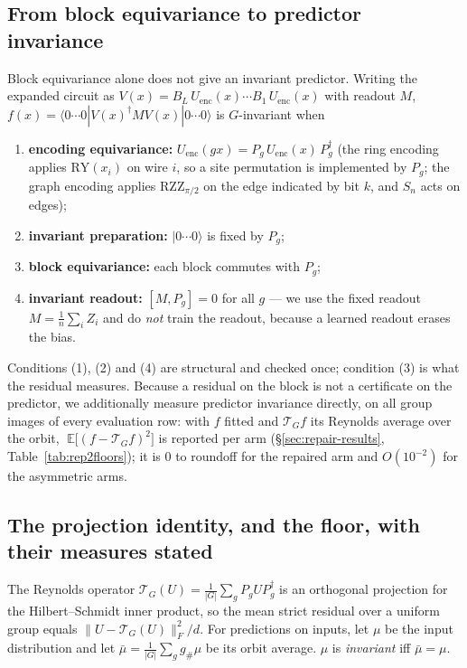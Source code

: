 \documentclass[11pt]{article}
\newcommand{\Tg}{\mathcal{T}_G}
\begin{document}
\subsection{From block equivariance to predictor invariance}
\label{sec:conditions}

Block equivariance alone does not give an invariant predictor. Writing the expanded
circuit as $V(x)=B_L\,U_{\mathrm{enc}}(x)\cdots B_1\,U_{\mathrm{enc}}(x)$ with readout
$M$, $f(x)=\langle 0\cdots0|V(x)^{\dagger} M V(x)|0\cdots0\rangle$ is $G$-invariant when
\begin{enumerate}[leftmargin=1.4em,itemsep=1pt,topsep=1pt]
  \item \textbf{encoding equivariance:} $U_{\mathrm{enc}}(gx)=P_g\,U_{\mathrm{enc}}(x)\,
        P_g^{\dagger}$ (the ring encoding applies $\mathrm{RY}(x_i)$ on wire $i$, so a site
        permutation is implemented by $P_g$; the graph encoding applies
        $\mathrm{RZZ}_{\pi/2}$ on the edge indicated by bit $k$, and $S_n$ acts on edges);
  \item \textbf{invariant preparation:} $\lvert 0\cdots0\rangle$ is fixed by $P_g$;
  \item \textbf{block equivariance:} each block commutes with $P_g$;
  \item \textbf{invariant readout:} $[M,P_g]=0$ for all $g$ --- we use the fixed readout
        $M=\frac1n\sum_i Z_i$ and do \emph{not} train the readout, because a learned
        readout erases the bias.
\end{enumerate}
Conditions (1), (2) and (4) are structural and checked once; condition (3) is what the
residual measures. Because a residual on the block is not a certificate on the predictor,
we additionally measure predictor invariance directly, on all group images of every
evaluation row: with $f$ fitted and $\Tg f$ its Reynolds average over the orbit,
$\;\mathbb{E}\bigl[(f-\Tg f)^2\bigr]$ is reported per arm
(\S\ref{sec:repair-results}, Table~\ref{tab:rep2floors}); it is $0$ to roundoff for the repaired
arm and $O(10^{-2})$ for the asymmetric arms.

\subsection{The projection identity, and the floor, with their measures stated}
\label{sec:floor}

The Reynolds operator $\Tg(U)=\frac{1}{|G|}\sum_{g}P_g U P_g^{\dagger}$ is an orthogonal
projection for the Hilbert--Schmidt inner product, so the mean strict residual over a
uniform group equals $\lVert U-\Tg(U)\rVert_F^2/d$. For predictions on inputs, let $\mu$
be the input distribution and let $\bar\mu=\frac1{|G|}\sum_g g_\#\mu$ be its orbit
average. $\mu$ is \emph{invariant} iff $\bar\mu=\mu$.
\end{document}
